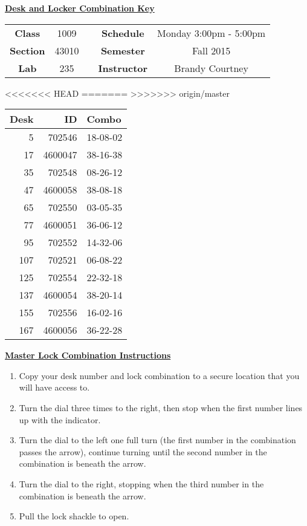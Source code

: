 \documentclass[12pt]{article}
\begin{document}
\thispagestyle{empty}

\begin{center}
	{\huge\textbf{\underline{ Desk and Locker Combination Key}}}
\end{center}


\begin{table}[h]
  \centering
  \begin{tabular}{ccccc}

  \textbf{Class} & 1009 & {\qquad} &\textbf{Schedule} & Monday 3:00pm - 5:00pm \\
  \textbf{Section} & 43010 & {\qquad} & \textbf{Semester} & Fall 2015 \\
  \textbf{Lab} & 235 & {\qquad} & \textbf{Instructor} & Brandy Courtney \\
  \end{tabular}
\end{table}
<<<<<<< HEAD
 \vspace{0.1in}
=======
 \vspace{0.5in}
>>>>>>> origin/master
\begin{minipage}{0.4\textwidth}

\begin{tabular}{rrl}
\toprule
 Desk &       ID &     Combo \\
\midrule
    5 &   702546 &  18-08-02 \\
   17 &  4600047 &  38-16-38 \\
   35 &   702548 &  08-26-12 \\
   47 &  4600058 &  38-08-18 \\
   65 &   702550 &  03-05-35 \\
   77 &  4600051 &  36-06-12 \\
   95 &   702552 &  14-32-06 \\
  107 &   702521 &  06-08-22 \\
  125 &   702554 &  22-32-18 \\
  137 &  4600054 &  38-20-14 \\
  155 &   702556 &  16-02-16 \\
  167 &  4600056 &  36-22-28 \\
\bottomrule
\end{tabular}


\end{minipage}
\begin{minipage}{0.4\textwidth}
\underline{{\large \textbf{Master Lock Combination Instructions}}}
\begin{enumerate}
\item Copy your desk number and lock combination to a secure location that you will have access to.
\item Turn the dial three times to the right, then stop when the first number lines up with the indicator.
\item Turn the dial to the left one full turn (the first number in the combination passes the arrow), continue turning until the second number in the combination is beneath the arrow.
\item Turn the dial to the right, stopping when the third number in the combination is beneath the arrow.
\item Pull the lock shackle to open.
\end{enumerate}
\end{minipage}
\end{document}
